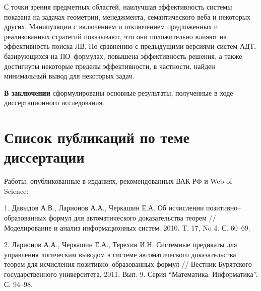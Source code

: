 \documentclass[a4paper]{report}
\begin{document}
С точки зрения предметных областей, наилучшая эффективность системы показана на задачах геометрии, менеджмента, семантического веба и некоторых других. Манипуляции с включением и отключением предложенных и реализованных стратегий показывают, что они положительно влияют на эффективность поиска ЛВ. По сравнению с предыдущими версиями систем АДТ, базирующихся на ПО--формулах, повышена эффективность решения, а также достигнуты некоторые пределы эффективности, в частности, найден минимальный вывод для некоторых задач.



\textbf{В заключении} сформулированы основные результаты, полученные в ходе диссертационного исследования.



\section*{Список публикаций по теме диссертации}

Работы, опубликованные в изданиях, рекомендованных ВАК РФ и Web of Science:

1. Давыдов А.В., Ларионов А.А., Черкашин Е.А. Об исчислении
позитивно--образованных формул для автоматического доказательства
теорем // Моделирование и анализ информационных систем. 2010. T. 17, No
4. С. 60--69.

2. Ларионов А.А., Черкашин Е.А., Терехин И.Н. Системные предикаты для
управления логическим выводом в системе автоматического доказательства
теорем для исчисления позитивно--образованных формул // Вестник
Бурятского государственного университета, 2011. Вып. 9. Серия
``Математика. Информатика''. С. 94--98.
\end{document}
